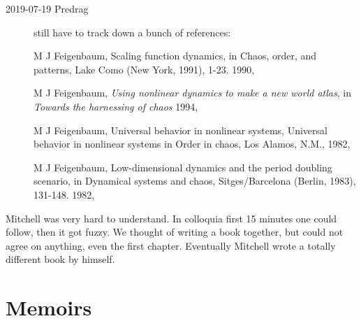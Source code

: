 \begin{description}
\item[2019-07-19 Predrag]
still have to track down a bunch of references:

M J Feigenbaum,
Scaling function dynamics,
in Chaos, order, and patterns, Lake Como (New York, 1991), 1-23.
{1990},

M J Feigenbaum, \emph{Using nonlinear dynamics to make a new world atlas}, in
 \emph{Towards the harnessing of chaos} %
{1994},

M J Feigenbaum, Universal behavior in nonlinear systems,
{Universal behavior in nonlinear systems}
in Order in chaos, Los Alamos, N.M.,
{1982},

M J Feigenbaum,
Low-dimensional dynamics and the period doubling scenario,
in Dynamical systems and chaos, Sitges/Barcelona (Berlin, 1983), 131-148.
{1982},

\end{description}


Mitchell was very hard to understand. In colloquia first 15 minutes one
could follow, then it got fuzzy. We thought of writing a book together,
but could not agree on anything, even the first chapter. Eventually
Mitchell wrote a totally different book by himself.

\section{Memoirs}
\label{sect:Memoirs}

